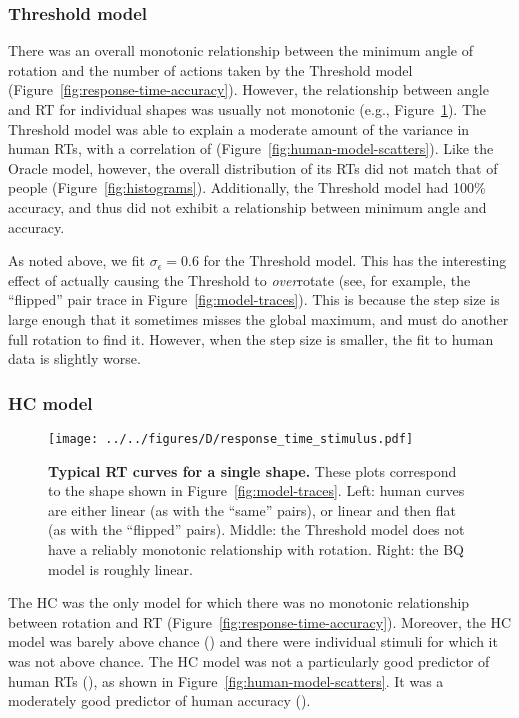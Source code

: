 \documentclass[10pt,letterpaper]{article}
\newcommand{\Oc}[0]{Oracle}
\newcommand{\Th}[0]{Threshold}
\newcommand{\Hc}[0]{HC}
\newcommand{\Bq}[0]{BQ}
\begin{document}
\subsubsection{\Th{} model}

There was an overall monotonic relationship between the minimum angle
of rotation and the number of actions taken by the \Th{} model
(Figure~\ref{fig:response-time-accuracy}). However, the relationship
between angle and RT for individual shapes was usually not monotonic
(e.g., Figure~\ref{fig:response-time-stimulus}).  The \Th{} model was
able to explain a moderate amount of the variance in human RTs, with a
correlation of \ThTimeCorr{}
(Figure~\ref{fig:human-model-scatters}). Like the \Oc{} model,
however, the overall distribution of its RTs did not match that of
people (Figure~\ref{fig:histograms}). Additionally, the \Th{} model
had 100\% accuracy, and thus did not exhibit a relationship between
minimum angle and accuracy.

As noted above, we fit $\sigma_\epsilon=0.6$ for the \Th{} model. This
has the interesting effect of actually causing the \Th{} to
\textit{over}rotate (see, for example, the ``flipped'' pair trace in
Figure~\ref{fig:model-traces}). This is because the step size is large
enough that it sometimes misses the global maximum, and must do
another full rotation to find it. However, when the step size is
smaller, the fit to human data is slightly worse.

\subsubsection{\Hc{} model}

\begin{figure}[t]
  \begin{center}
    \texttt{[image: ../../figures/D/response\_time\_stimulus.pdf]}
    \caption{\textbf{Typical RT curves for a single shape.}  These
      plots correspond to the shape shown in
      Figure~\ref{fig:model-traces}. Left: human curves are either
      linear (as with the ``same'' pairs), or linear and then flat (as
      with the ``flipped'' pairs). Middle: the \Th{} model does not
      have a reliably monotonic relationship with rotation. Right: the
      \Bq{} model is roughly linear.}
    \label{fig:response-time-stimulus}
  \end{center}
\end{figure}

The \Hc{} was the only model for which there was no monotonic
relationship between rotation and RT
(Figure~\ref{fig:response-time-accuracy}). Moreover, the \Hc{} model
was barely above chance (\HcAccuracy{}) and there were \HcNumChance{}
individual stimuli for which it was not above chance. The \Hc{} model
was not a particularly good predictor of human RTs (\HcTimeCorr{}), as
shown in Figure~\ref{fig:human-model-scatters}. It was a moderately
good predictor of human accuracy (\HcAccuracyCorr{}).
\end{document}
